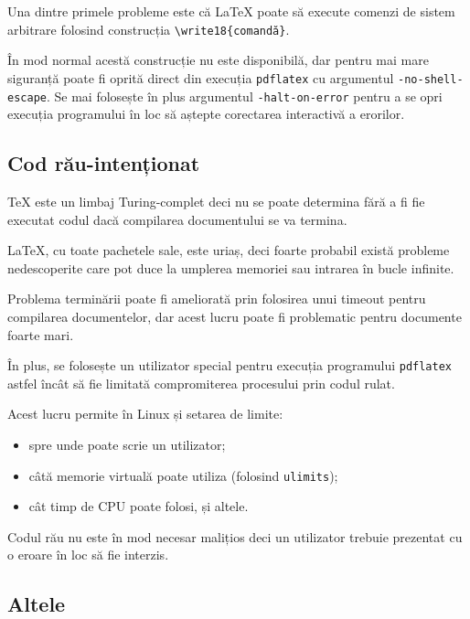 \documentclass[a4wide,12pt]{report}
\newcommand{\eng}[1]{{#1}} %
\newcommand{\cod}[1]{\texttt{#1}}
\newcommand{\poate}[1]{#1}
\begin{document}
Una dintre primele probleme este că \LaTeX{} poate să execute comenzi de sistem
arbitrare folosind construcția \cod{\textbackslash write18\{comandă\}}.

În mod normal acestă construcție nu este disponibilă, dar pentru mai mare
siguranță poate fi oprită direct din execuția \cod{pdflatex} cu argumentul
\cod{-no-shell-escape}. \poate{Se mai folosește în plus argumentul
\cod{-halt-on-error} pentru a se opri execuția programului în loc să aștepte
corectarea interactivă a erorilor.}

\subsection{Cod rău-intenționat}

\TeX{} este un limbaj Turing-complet\cite{basictc} deci nu se poate determina fără a fi fie
executat codul dacă compilarea documentului se va termina.

\LaTeX{}, cu toate pachetele sale, este uriaș, deci foarte probabil există
probleme nedescoperite care pot duce la umplerea memoriei sau intrarea în bucle
infinite.

Problema terminării poate fi ameliorată prin folosirea unui \eng{timeout} pentru
compilarea documentelor, dar acest lucru poate fi problematic pentru documente
foarte mari.

În plus, se folosește un utilizator special pentru execuția programului
\cod{pdflatex} astfel încât să fie limitată compromiterea procesului prin codul
rulat.

Acest lucru permite în Linux și setarea de limite:

\begin{itemize}

\item spre unde poate scrie un utilizator;

\item câtă memorie virtuală poate utiliza (folosind \cod{ulimits});

\item cât timp de CPU poate folosi, și altele.

\end{itemize}

Codul rău nu este în mod necesar malițios deci un utilizator trebuie prezentat
cu o eroare în loc să fie interzis.

\subsection{Altele}
\end{document}
